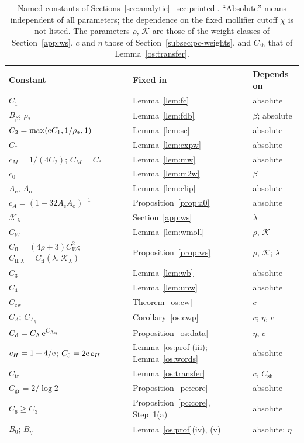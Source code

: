 \begin{table}[!ht]
\centering\small
\caption{Named constants of Sections~\ref{sec:analytic}--\ref{sec:printed}. ``Absolute'' means independent of all parameters;
the dependence on the fixed mollifier cutoff $\chi$ is not listed. The parameters $\rho$, $\mathcal K$ are those of the weight classes
of Section~\ref{app:ws}, $c$ and $\eta$ those of Section~\ref{subsec:pc-weights}, and $C_{\mathrm{sh}}$ that of Lemma~\ref{os:transfer}.}\label{tab:constants}
\begin{tabular}{@{}lll@{}}
\hline
Constant & Fixed in & Depends on\\
\hline
$C_1$ & Lemma~\ref{lem:fc} & absolute\\
$B_\beta$; $\rho_*$ & Lemma~\ref{lem:fdb} & $\beta$; absolute\\
$C_2=\max(\mathrm{e} C_1,1/\rho_*,1)$ & Lemma~\ref{lem:sc} & absolute\\
$C_*$ & Lemma~\ref{lem:expw} & absolute\\
$c_M=1/(4C_2)$; $C_M=C_*$ & Lemma~\ref{lem:mw} & absolute\\
$c_0$ & Lemma~\ref{lem:m2w} & $\beta$\\
$A_{\mathrm e}$, $A_{\mathrm o}$ & Lemma~\ref{lem:clip} & absolute\\
$c_A=(1+32A_{\mathrm e}A_{\mathrm o})^{-1}$ & Proposition~\ref{prop:a0} & absolute\\
$\mathcal K_\lambda$ & Section~\ref{app:ws} & $\lambda$\\
$C_W$ & Lemma~\ref{lem:wmoll} & $\rho$, $\mathcal K$\\
$C_{\mathrm{fl}}=(4\rho+3)C_W^2$; $C_{\mathrm{fl},\lambda}=C_{\mathrm{fl}}(\lambda,\mathcal K_\lambda)$ & Proposition~\ref{prop:ws} & $\rho$, $\mathcal K$; $\lambda$\\
$C_3$ & Lemma~\ref{lem:wb} & absolute\\
$C_4$ & Lemma~\ref{lem:unw} & absolute\\
$C_{\mathrm{cw}}$ & Theorem~\ref{os:cw} & $c$\\
$C_\Lambda$; $C_{\Lambda_\eta}$ & Corollary~\ref{os:cwp} & $c$; $\eta$, $c$\\
$C_{\mathrm d}=C_\Lambda\,\mathrm{e}^{C_{\Lambda_\eta}}$ & Proposition~\ref{os:data} & $\eta$, $c$\\
$c_H=1+4/\mathrm{e}$; $C_5=2\mathrm{e}\,c_H$ & Lemma~\ref{os:prof}(iii); Lemma~\ref{os:words} & absolute\\
$C_{\mathrm{tr}}$ & Lemma~\ref{os:transfer} & $c$, $C_{\mathrm{sh}}$\\
$C_{\mathrm{gr}}=2/\log2$ & Proposition~\ref{pc:core} & absolute\\
$C_6\ge C_3$ & Proposition~\ref{pc:core}, Step~1(a) & absolute\\
$B_0$; $B_\eta$ & Lemma~\ref{os:prof}(iv), (v) & absolute; $\eta$\\
\hline
\end{tabular}
\end{table}
